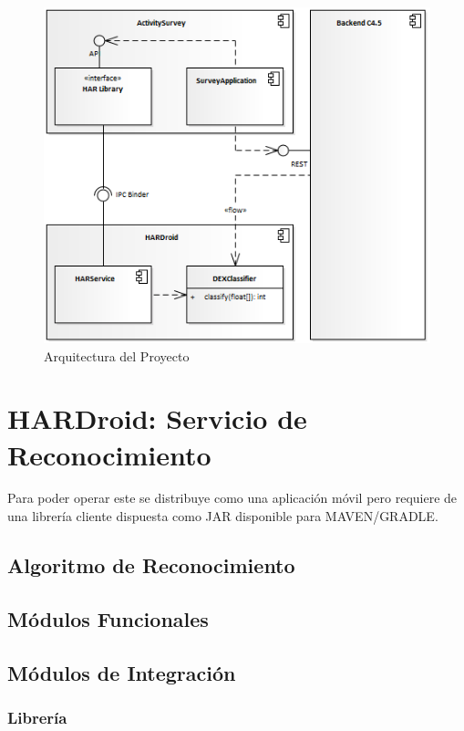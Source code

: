 \begin{figure}
\begin{centering}
\includegraphics[width=0.8\columnwidth]{capitulo-5/graphics/arqui_general}
\par\end{centering}
\caption[Arquitectura del Proyecto]{\label{fig5:arqui-general}Arquitectura del Proyecto}

\end{figure}


\section{HARDroid: Servicio de Reconocimiento}

\label{sec54:hardroid}Para poder operar este se distribuye como una
aplicación móvil pero requiere de una librería cliente dispuesta como
JAR disponible para MAVEN/GRADLE.

\subsection{Algoritmo de Reconocimiento}

\subsection{Módulos Funcionales}

\subsection{Módulos de Integración}

\subsubsection{Librería }

